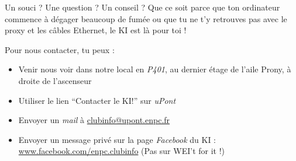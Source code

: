 \documentclass{ki019}
\begin{document}
  \vspace{2cm}

    Un souci ? Une question ? Un conseil ? Que ce soit parce que ton ordinateur commence à dégager beaucoup de fumée ou que tu ne t’y retrouves pas avec le proxy et les câbles Ethernet, le KI est là pour toi !

    Pour nous contacter, tu peux :
\begin{itemize}
  \item Venir nous voir dans notre local en \emph{P401}, au dernier étage de l’aile Prony, à droite de l’ascenseur
  \item Utiliser le lien “Contacter le KI!” sur \emph{uPont}
  \item Envoyer un \emph{mail} à \href{mailto:clubinfo@upont.enpc.fr}{clubinfo@upont.enpc.fr}
  \item Envoyer un message privé sur la page \emph{Facebook} du KI : \\ \href{www.facebook.com/enpc.clubinfo}{www.facebook.com/enpc.clubinfo} (Pas sur WEI’t for it !)
\end{itemize}
\end{document}
